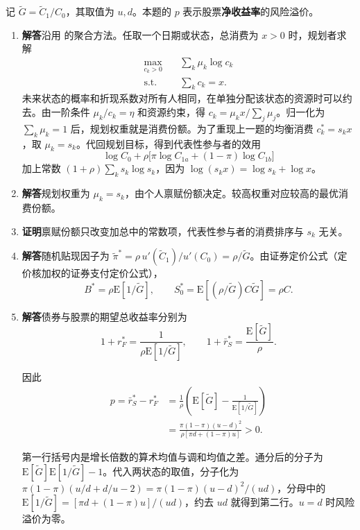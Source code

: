 \begin{solution}[blank-type=manual,blank-vsep=12\baselineskip]
记 $\widetilde G=\widetilde C_1/C_0$，其取值为 $u,d$。本题的 $p$ 表示股票\textbf{净收益率}的风险溢价。
\begin{enumerate}[label=(\alph*)]
 \item \textbf{解答}\quad 沿用 的聚合方法。任取一个日期或状态，总消费为 $x>0$ 时，规划者求解
 \[
 \begin{aligned}
 \max_{c_k>0}\quad &\sum_k\mu_k\log c_k\\
 \text{s.t.}\quad &\sum_kc_k=x .
 \end{aligned}
 \]
 未来状态的概率和折现系数对所有人相同，在单独分配该状态的资源时可以约去。由一阶条件 $\mu_k/c_k=\eta$ 和资源约束，得 $c_k=\mu_kx/\sum_j\mu_j$。归一化为 $\sum_k\mu_k=1$ 后，规划权重就是消费份额。为了重现上一题的均衡消费 $c_k^*=s_kx$，取 $\mu_k=s_k$。代回规划目标，得到代表性参与者的效用
 \[
 \log C_0+\rho\bigl[\pi\log C_{1a}+(1-\pi)\log C_{1b}\bigr]
 \]
 加上常数 $(1+\rho)\sum_k s_k\log s_k$，因为 $\log(s_kx)=\log s_k+\log x$。

 \item \textbf{解答}\quad 规划权重为 $\mu_k=s_k$，由个人禀赋份额决定。较高权重对应较高的最优消费份额。

 \item \textbf{证明}\quad 禀赋份额只改变加总中的常数项，代表性参与者的消费排序与 $s_k$ 无关。

 \item \textbf{解答}\quad 随机贴现因子为 $\widetilde\pi^*=\rho\,u'(\widetilde C_1)/u'(C_0)=\rho/\widetilde G$。由\ifdefined\WJHandoutKnowledge {}\else 证券定价公式\fi（定价核加权的证券支付定价公式），
 \[
 B^*=\rho\mathrm E[1/\widetilde G],\qquad
 S_0^*=\mathrm E[(\rho/\widetilde G)C\widetilde G]=\rho C.
 \]

 \item \textbf{解答}\quad 债券与股票的期望总收益率分别为
 \[
 1+r_F^*=\frac1{\rho\mathrm E[1/\widetilde G]},\qquad
 1+\bar r_S^*=\frac{\mathrm E[\widetilde G]}\rho.
 \]

 因此
 \[
 \begin{aligned}
 p=\bar r_S^*-r_F^*
 &=\frac1\rho\left(\mathrm E[\widetilde G]-\frac1{\mathrm E[1/\widetilde G]}\right)\\
 &=\frac{\pi(1-\pi)(u-d)^2}{\rho[\pi d+(1-\pi)u]}>0.
 \end{aligned}
 \]

 第一行括号内是增长倍数的算术均值与调和均值之差。通分后的分子为 $\mathrm E[\widetilde G]\mathrm E[1/\widetilde G]-1$。代入两状态的取值，分子化为 $\pi(1-\pi)(u/d+d/u-2)=\pi(1-\pi)(u-d)^2/(ud)$，分母中的 $\mathrm E[1/\widetilde G]=[\pi d+(1-\pi)u]/(ud)$，约去 $ud$ 就得到第二行。$u=d$ 时风险溢价为零。


\end{enumerate}
\end{solution}
